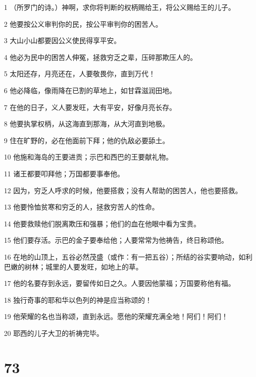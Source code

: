 \par 1 （所罗门的诗。）神啊，求你将判断的权柄赐给王，将公义赐给王的儿子。
\par 2 他要按公义审判你的民，按公平审判你的困苦人。
\par 3 大山小山都要因公义使民得享平安。
\par 4 他必为民中的困苦人伸冤，拯救穷乏之辈，压碎那欺压人的。
\par 5 太阳还存，月亮还在，人要敬畏你，直到万代！
\par 6 他必降临，像雨降在已割的草地上，如甘霖滋润田地。
\par 7 在他的日子，义人要发旺，大有平安，好像月亮长存。
\par 8 他要执掌权柄，从这海直到那海，从大河直到地极。
\par 9 住在旷野的，必在他面前下拜；他的仇敌必要舔土。
\par 10 他施和海岛的王要进贡；示巴和西巴的王要献礼物。
\par 11 诸王都要叩拜他；万国都要事奉他。
\par 12 因为，穷乏人呼求的时候，他要搭救；没有人帮助的困苦人，他也要搭救。
\par 13 他要怜恤贫寒和穷乏的人，拯救穷苦人的性命。
\par 14 他要救赎他们脱离欺压和强暴；他们的血在他眼中看为宝贵。
\par 15 他们要存活。示巴的金子要奉给他；人要常常为他祷告，终日称颂他。
\par 16 在地的山顶上，五谷必然茂盛（或作：有一把五谷）；所结的谷实要响动，如利巴嫩的树林；城里的人要发旺，如地上的草。
\par 17 他的名要存到永远，要留传如日之久。人要因他蒙福；万国要称他有福。
\par 18 独行奇事的耶和华以色列的神是应当称颂的！
\par 19 他荣耀的名也当称颂，直到永远。愿他的荣耀充满全地！阿们！阿们！
\par 20 耶西的儿子大卫的祈祷完毕。

\chapter{73}

